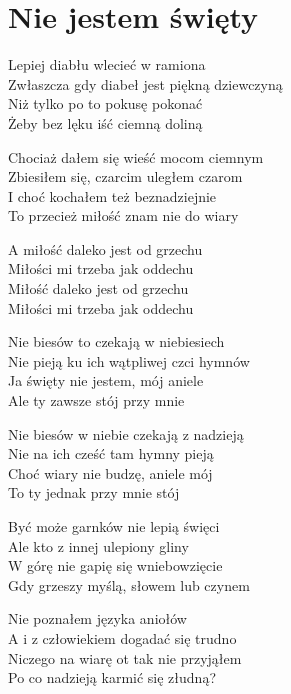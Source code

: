 \section{Nie jestem święty}
\begin{text}
Lepiej diabłu wlecieć w ramiona\\
Zwłaszcza gdy diabeł jest piękną dziewczyną\\
Niż tylko po to pokusę pokonać\\
Żeby bez lęku iść ciemną doliną

Chociaż dałem się wieść mocom ciemnym\\
Zbiesiłem się, czarcim uległem czarom\\
I choć kochałem też beznadziejnie\\
To przecież miłość znam nie do wiary

\vin A miłość daleko jest od grzechu\\
\vin Miłości mi trzeba jak oddechu\\
\vin Miłość daleko jest od grzechu\\
\vin Miłości mi trzeba jak oddechu

\vin Nie biesów to czekają w niebiesiech\\
\vin Nie pieją ku ich wątpliwej czci hymnów\\
\vin Ja święty nie jestem, mój aniele\\
\vin Ale ty zawsze stój przy mnie

\vin Nie biesów w niebie czekają z nadzieją\\
\vin Nie na ich cześć tam hymny pieją\\
\vin Choć wiary nie budzę, aniele mój\\
\vin To ty jednak przy mnie stój

Być może garnków nie lepią święci\\
Ale kto z innej ulepiony gliny\\
W górę nie gapię się wniebowzięcie\\
Gdy grzeszy myślą, słowem lub czynem

Nie poznałem języka aniołów\\
A i z człowiekiem dogadać się trudno\\
Niczego na wiarę ot tak nie przyjąłem\\
Po co nadzieją karmić się złudną?
\end{text}